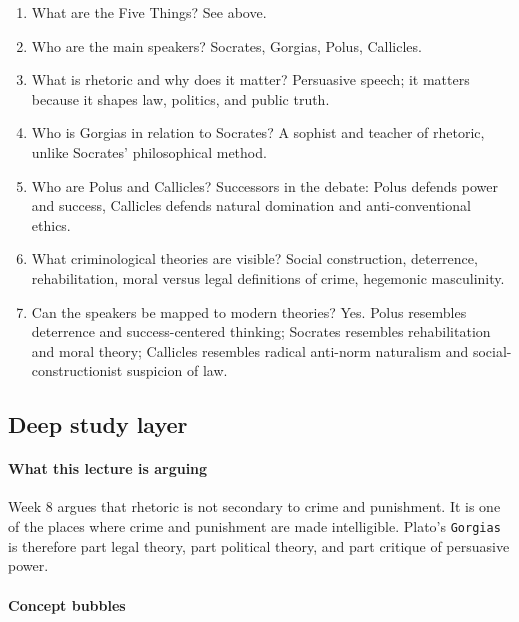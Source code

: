 \documentclass[11pt]{article}
\begin{document}
\begin{enumerate}
\item What are the Five Things? See above.
\item Who are the main speakers? Socrates, Gorgias, Polus, Callicles.
\item What is rhetoric and why does it matter? Persuasive speech; it matters because it shapes law, politics, and public truth.
\item Who is Gorgias in relation to Socrates? A sophist and teacher of rhetoric, unlike Socrates' philosophical method.
\item Who are Polus and Callicles? Successors in the debate: Polus defends power and success, Callicles defends natural domination and anti-conventional ethics.
\item What criminological theories are visible? Social construction, deterrence, rehabilitation, moral versus legal definitions of crime, hegemonic masculinity.
\item Can the speakers be mapped to modern theories? Yes. Polus resembles deterrence and success-centered thinking; Socrates resembles rehabilitation and moral theory; Callicles resembles radical anti-norm naturalism and social-constructionist suspicion of law.
\end{enumerate}

\subsection{Deep study layer}

\paragraph{What this lecture is arguing}

Week 8 argues that rhetoric is not secondary to crime and punishment. It is one of the places where crime and punishment are made intelligible. Plato's \texttt{Gorgias} is therefore part legal theory, part political theory, and part critique of persuasive power.

\paragraph{Concept bubbles}
\end{document}
